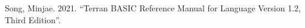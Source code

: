 \begin{itemlist}
\item Song, Minjae. 2021. ``Terran BASIC Reference Manual for Language Version 1.2, Third Edition''.
\end{itemlist}
